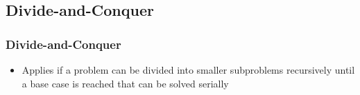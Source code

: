 \documentclass[xcolor=dvipsnames]{beamer}
\begin{document}
	\subsection{Divide-and-Conquer}
		
		\begin{frame} \frametitle{Divide-and-Conquer}
			\begin{itemize}
				\item Applies if a problem can be divided into smaller subproblems recursively until a base case is reached that can be solved serially
			\end{itemize}
		\end{frame}
\end{document}
